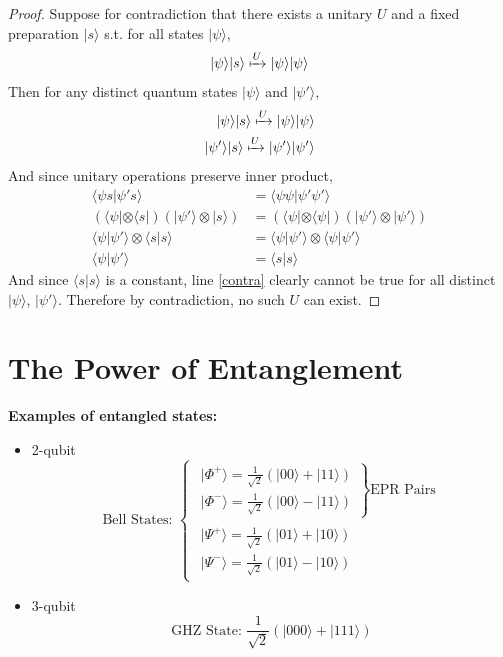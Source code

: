 \documentclass[11pt]{article}
\newcommand{\ket}[1]{| #1 \rangle}
\newcommand{\bra}[1]{\langle #1 |}
\newcommand{\inner}[2]{\langle #1 | #2 \rangle}
\newcommand{\makeroom}{\vspace{5mm}\noindent}
\begin{document}
\makeroom
\begin{proof}
Suppose for contradiction that there exists a unitary $U$ and a fixed
preparation $\ket{s}$ s.t. for all states $\ket\psi$,
\begin{align*}
\ket\psi \ket{s} \xmapsto{U} \ket\psi \ket\psi
\end{align*}
Then for any distinct quantum states $\ket\psi$ and $\ket{\psi'}$,
\begin{align*}
   \ket\psi    \ket{s} \xmapsto{U} \ket\psi    \ket\psi
\\ \ket{\psi'} \ket{s} \xmapsto{U} \ket{\psi'} \ket{\psi'}
\end{align*}
And since unitary operations preserve inner product,
\begin{align}
   \inner{\psi s}{\psi' s} &= \inner{\psi\psi}{\psi'\psi'}
\\ (\bra\psi \otimes \bra{s})(\ket{\psi'} \otimes \ket{s})
        &= (\bra\psi \otimes \bra\psi)(\ket{\psi'} \otimes \ket{\psi'})
\\ \inner{\psi}{\psi'} \otimes \inner{s}{s}
        &= \inner{\psi}{\psi'} \otimes \inner{\psi}{\psi'}
\\ \inner{\psi}{\psi'} &= \inner{s}{s} \label{contra}
\end{align}
And since $\inner{s}{s}$ is a constant, line \ref{contra} clearly cannot be true
for all distinct $\ket\psi$, $\ket{\psi'}$. Therefore by contradiction, no such
$U$ can exist.
\end{proof}

\section{The Power of Entanglement}

\textbf{Examples of entangled states:}
\begin{itemize}
\item 2-qubit
\[\text{Bell States: } \left\{
\begin{array}{l}
        \left.\begin{array}{l}
                \ket{\Phi^+} = \frac{1}{\sqrt{2}}(\ket{00} + \ket{11})
        \\      \ket{\Phi^-} = \frac{1}{\sqrt{2}}(\ket{00} - \ket{11})
        \end{array} \right\}\text{EPR Pairs}
\\      \left.\begin{array}{l}
                \ket{\Psi^+} = \frac{1}{\sqrt{2}}(\ket{01} + \ket{10})
        \\      \ket{\Psi^-} = \frac{1}{\sqrt{2}}(\ket{01} - \ket{10})
        \end{array}\right.
\end{array}\right.\]
\item 3-qubit
\[\text{GHZ State: } \frac{1}{\sqrt{2}}(\ket{000} + \ket{111})\]
\end{itemize}
\end{document}
